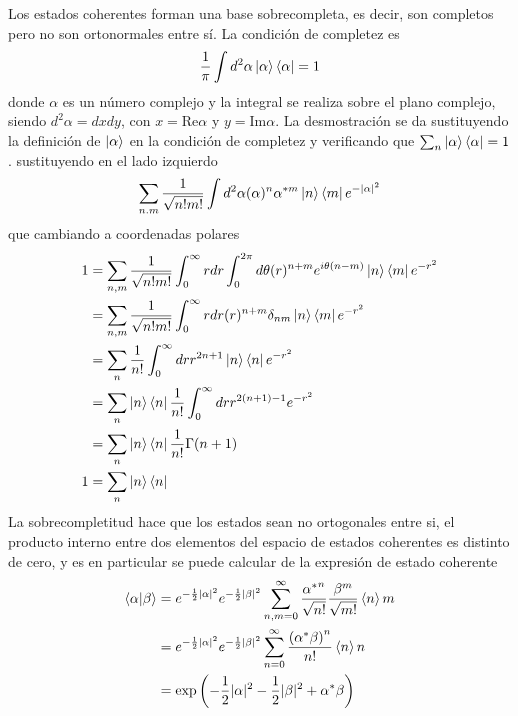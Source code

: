 Los estados coherentes forman una base sobrecompleta, es decir, son completos pero no son ortonormales entre sí. La condición de completez es
\begin{equation*}
  \frac{1}{\pi}\int d^2 \alpha \ket{\alpha}\bra{\alpha} = 1
\end{equation*}
donde $\alpha$ es un número complejo y la integral se realiza sobre el plano complejo, siendo $d^2\alpha = dxdy$, con $x = \mathrm{Re}\alpha$ y $y = \mathrm{Im}\alpha$. La desmostración se da sustituyendo la definición de $\ket{\alpha}$ en la condición de completez y verificando que $\sum_n \ket{\alpha}\bra{\alpha}=1$. sustituyendo en el lado izquierdo
\begin{equation*}
  \sum_{n.m} \frac{1}{\sqrt{n!m!}}\int d^2\alpha (\alpha)^n \alpha^{*m}\ket{n}\bra{m}e^{-|\alpha|^2}
\end{equation*}
que cambiando a coordenadas polares
\begin{align*}
  1 & = \sum_{n,m}\frac{1}{\sqrt{n!m!}}\int_0^{\infty} rdr \int_{0}^{2\pi}d\theta (r)^{n+m}e^{i\theta(n-m)}\ket{n}\bra{m}e^{-r^2} \\ & = \sum_{n,m}\frac{1}{\sqrt{n!m!}}\int_0^{\infty} rdr  (r)^{n+m} \delta_{nm} \ket{n}\bra{m}e^{-r^2} \\
    & = \sum_{n}\frac{1}{n!}\int_0^{\infty} dr  r^{2n+1} \ket{n}\bra{n}e^{-r^2}                                                   \\
    & = \sum_{n} \ket{n}\bra{n} \frac{1}{n!}\int_0^{\infty} dr  r^{2(n+1)-1} e^{-r^2}                                             \\
    & = \sum_{n} \ket{n}\bra{n} \frac{1}{n!} \Gamma(n+1)                                                                          \\
  1 & = \sum_{n} \ket{n}\bra{n}
\end{align*}
La sobrecompletitud hace que los estados sean no ortogonales entre si, el producto interno entre dos elementos del espacio de estados coherentes es distinto de cero, y es en particular se puede calcular de la expresión de estado coherente
\begin{align*}
  \braket{\alpha|\beta} & = e^{-\frac{1}{2}|\alpha|^2} e^{-\frac{1}{2}|\beta|^2} \sum_{n,m=0}^{\infty} \frac{{\alpha^*}^n}{\sqrt{n!}}\frac{\beta^m}{\sqrt{m!}} \braket{n}{m} \\
                        & = e^{-\frac{1}{2}|\alpha|^2} e^{-\frac{1}{2}|\beta|^2} \sum_{n=0}^{\infty} \frac{{(\alpha^*\beta)}^n}{n!} \braket{n}{n}                            \\
                        & = \exp{\left( - \frac{1}{2}|\alpha|^2 - \frac{1}{2}|\beta|^2 + \alpha^*\beta \right)}
\end{align*}
